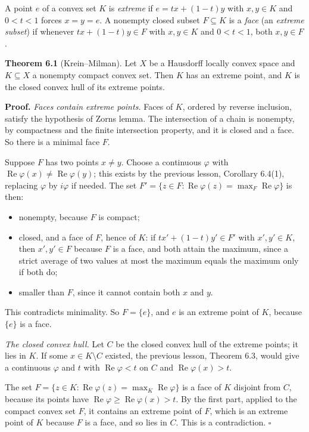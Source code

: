 \documentclass[
  english,
  11pt,
  a4paper,
]{article}
\newcounter{none} %
\providecommand{\tightlist}{%
  \setlength{\itemsep}{0pt}\setlength{\parskip}{0pt}}
\begin{document}
A point \(e\) of a convex set \(K\) is \emph{extreme} if \(e=tx+(1-t)y\)
with \(x,y\in K\) and \(0<t<1\) forces \(x=y=e\). A nonempty closed
subset \(F\subseteq K\) is a \emph{face} (an \emph{extreme subset}) if
whenever \(tx+(1-t)y\in F\) with \(x,y\in K\) and \(0<t<1\), both
\(x,y\in F\).

\textbf{Theorem 6.1} (Krein--Milman). Let \(X\) be a Hausdorff locally
convex space and \(K\subseteq X\) a nonempty compact convex set. Then
\(K\) has an extreme point, and \(K\) is the closed convex hull of its
extreme points.

\textbf{Proof.} \emph{Faces contain extreme points.} Faces of \(K\),
ordered by reverse inclusion, satisfy the hypothesis of
Zorn\textquotesingle s lemma. The intersection of a chain is nonempty,
by compactness and the finite intersection property, and it is closed
and a face. So there is a minimal face \(F\).

Suppose \(F\) has two points \(x\ne y\). Choose a continuous \(\varphi\)
with \(\operatorname{Re}\varphi(x)\ne\operatorname{Re}\varphi(y)\); this
exists by the previous lesson, Corollary 6.4(1), replacing \(\varphi\)
by \(i\varphi\) if needed. The set
\(F'=\{z\in F:\operatorname{Re}\varphi(z)=\max_F\operatorname{Re}\varphi\}\)
is then:

\begin{itemize}
\tightlist
\item
  nonempty, because \(F\) is compact;
\item
  closed, and a face of \(F\), hence of \(K\): if \(tx'+(1-t)y'\in F'\)
  with \(x',y'\in K\), then \(x',y'\in F\) because \(F\) is a face, and
  both attain the maximum, since a strict average of two values at most
  the maximum equals the maximum only if both do;
\item
  smaller than \(F\), since it cannot contain both \(x\) and \(y\).
\end{itemize}

This contradicts minimality. So \(F=\{e\}\), and \(e\) is an extreme
point of \(K\), because \(\{e\}\) is a face.

\emph{The closed convex hull.} Let \(C\) be the closed convex hull of
the extreme points; it lies in \(K\). If some \(x\in K\setminus C\)
existed, the previous lesson, Theorem 6.3, would give a continuous
\(\varphi\) and \(t\) with \(\operatorname{Re}\varphi<t\) on \(C\) and
\(\operatorname{Re}\varphi(x)>t\).

The set
\(F=\{z\in K:\operatorname{Re}\varphi(z)=\max_K\operatorname{Re}\varphi\}\)
is a face of \(K\) disjoint from \(C\), because its points have
\(\operatorname{Re}\varphi\ge\operatorname{Re}\varphi(x)>t\). By the
first part, applied to the compact convex set \(F\), it contains an
extreme point of \(F\), which is an extreme point of \(K\) because \(F\)
is a face, and so lies in \(C\). This is a contradiction. \(\square\)
\end{document}
